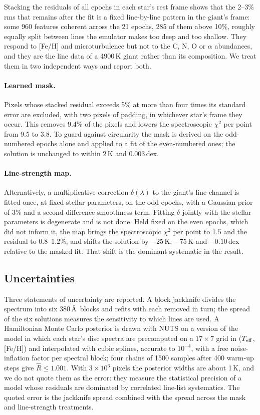 Stacking the residuals of all epochs in each star's rest frame shows that the
2--3\% rms that remains after the fit is a fixed line-by-line pattern in the
giant's frame: some 960 features coherent across the 21 epochs, 285 of them above
10\%, roughly equally split between lines the emulator makes too deep and too
shallow. They respond to [Fe/H] and microturbulence but not to the C, N, O or
$\alpha$ abundances, and they are the line data of a 4900\,K giant rather than
its composition. We treat them in two independent ways and report both.

\paragraph{Learned mask.}
Pixels whose stacked residual exceeds 5\% at more than four times its standard
error are excluded, with two pixels of padding, in whichever star's frame they
occur. This removes 9.4\% of the pixels and lowers the spectroscopic $\chi^2$
per point from 9.5 to 3.8. To guard against circularity the mask is derived on
the odd-numbered epochs alone and applied to a fit of the even-numbered ones;
the solution is unchanged to within 2\,K and 0.003\,dex.

\paragraph{Line-strength map.}
Alternatively, a multiplicative correction $\delta(\lambda)$ to the giant's line
channel is fitted once, at fixed stellar parameters, on the odd epochs, with a
Gaussian prior of 3\% and a second-difference smoothness term. Fitting $\delta$
jointly with the stellar parameters is degenerate and is not done. Held fixed on
the even epochs, which did not inform it, the map brings the spectroscopic
$\chi^2$ per point to 1.5 and the residual to 0.8--1.2\%, and shifts the solution
by $-25$\,K, $-75$\,K and $-0.10$\,dex relative to the masked fit. That shift is
the dominant systematic in the result.

\subsection{Uncertainties}

Three statements of uncertainty are reported. A block jackknife divides the
spectrum into six 380\,\AA\ blocks and refits with each removed in turn; the
spread of the six solutions measures the sensitivity to which lines are used.
A Hamiltonian Monte Carlo posterior is drawn with NUTS on a version of the model
in which each star's disc spectra are precomputed on a $17\times7$ grid in
($T_{\rm eff}$, [Fe/H]) and interpolated with cubic splines, accurate to
$10^{-4}$, with a free noise-inflation factor per spectral block; four chains of
1500 samples after 400 warm-up steps give $\hat R\le1.001$. With $3\times10^{6}$
pixels the posterior widths are about 1\,K, and we do not quote them as the
error: they measure the statistical precision of a model whose residuals are
dominated by correlated line-list systematics. The quoted error is the jackknife
spread combined with the spread across the mask and line-strength treatments.

